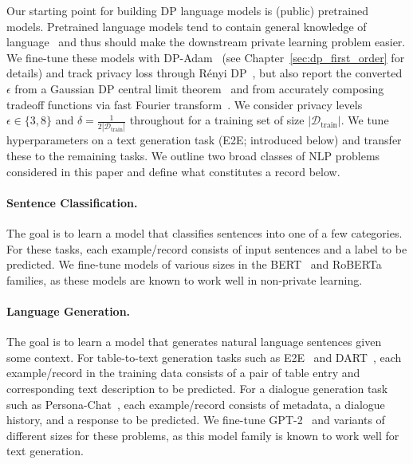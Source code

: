 Our starting point for building DP language models is (public) pretrained models. 
Pretrained language models tend to contain general knowledge of language~\citep{manning2020emergent} and thus should make the downstream private learning problem easier.
We fine-tune these models with DP-Adam~\citep{abadi2016deep,kingma2014adam} (see Chapter~\ref{sec:dp_first_order} for details) and track privacy loss through R\'enyi DP~\citep{mironov2017renyi}, but also report the converted $\epsilon$ from a Gaussian DP central limit theorem~\citep{dong2019gaussian} and from accurately composing tradeoff functions via fast Fourier transform~\citep{gopi2021numerical}.
We consider privacy levels $\epsilon \in \{3,8\}$ and $\delta = \tfrac{1}{2 |\mathcal{D}_\text{train}|}$ throughout
for a training set of size $|\mathcal{D}_\text{train}|$.
We tune hyperparameters on a text generation task (E2E; introduced below) and transfer these to the remaining tasks.
We outline two broad classes of NLP problems considered in this paper and define what constitutes a record below.

\paragraph{Sentence Classification.}
The goal is to learn a model that classifies sentences into one of a few categories.
For these tasks, each example/record consists of input sentences and a label to be predicted.
We fine-tune models of various sizes in the BERT~\citep{devlin2018bert} and RoBERTa~\citep{liu2019roberta} families, as these models are known to work well in non-private learning.

\paragraph{Language Generation.}
The goal is to learn a model that generates natural language sentences given some context.
For table-to-text generation tasks such as E2E~\citep{novikova2017e2e} and DART~\citep{nan2020dart}, each example/record in the training data consists of a pair of table entry and corresponding text description to be predicted. 
For a dialogue generation task such as Persona-Chat~\citep{zhang2018personalizing}, each example/record consists of metadata, a dialogue history, and a response to be predicted. 
We fine-tune GPT-2~\citep{radford2019language} and variants of different sizes for these problems, as this model family is known to work well for text generation. 
